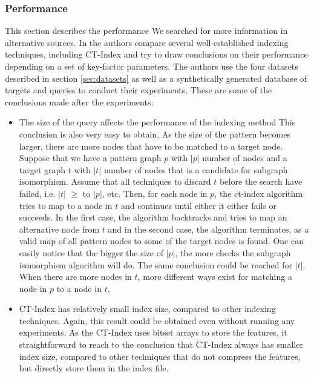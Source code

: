 \documentclass{l4proj}
\theoremstyle{definition}
\begin{document}
\subsubsection{Performance}
\label{sec:ct-index-performance}
This section describes the performance 
We searched for more information in alternative sources. In \cite{foteini} the authors compare several well-established indexing techniques, including CT-Index and try to draw conclusions on their performance depending on a set of key-factor parameters. The authors use the four datasets described in section \ref{sec:datasets} as well as a synthetically generated database of targets and queries to conduct their experiments. These are some of the conclusions made after the experiments:
\begin{itemize}
\item The size of the query affects the performance of the indexing method\newline
This conclusion is also very easy to obtain. As the size of the pattern becomes larger, there are more nodes that have to be matched to a target node. Suppose that we have a pattern graph $p$ with $|p|$ number of nodes and a target graph $t$ with $|t|$ number of nodes that is a candidate for subgraph isomorphism. Assume that all techniques to discard $t$ before the search have failed, i.e. $|t|$ $\geq$ to $|p|$, etc. Then, for each node in $p$, the ct-index algorithm tries to map to a node in $t$ and continues until either it either fails or succeeds. In the first case, the algorithm backtracks and tries to map an alternative node from $t$ and in the second case, the algorithm terminates, as a valid map of all pattern nodes to some of the target nodes is found. One can easily notice that the bigger the size of $|p|$, the more checks the subgraph isomorphism algorithm will do. The same conclusion could be reached for $|t|$. When there are more nodes in $t$, more different ways exist for matching a node in $p$ to a node in $t$.
\item CT-Index has relatively small index size, compared to other indexing techniques.\newline
Again, this result could be obtained even without running any experiments. As the CT-Index uses bitset arrays to store the features, it straightforward to reach to the conclusion that CT-Index always has smaller index size, compared to other techniques that do not compress the features, but directly store them in the index file.\par
\end{itemize}
\end{document}
